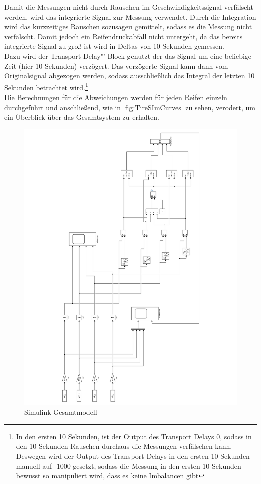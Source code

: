 \vspace{-1em}
Damit die Messungen nicht durch Rauschen im Geschwindigkeitssignal verfälscht werden, wird das integrierte Signal zur Messung verwendet. Durch die Integration wird das kurzzeitiges Rauschen sozusagen gemittelt, sodass es die Messung nicht verfälscht. Damit jedoch ein Reifendruckabfall nicht untergeht, da das bereits integrierte Signal zu groß ist wird in Deltas von 10 Sekunden gemessen.\\
Dazu wird der  \glqq Transport Delay"' Block genutzt der das Signal um eine beliebige Zeit (hier 10 Sekunden) verzögert. Das verzögerte Signal kann dann vom Originalsignal abgezogen werden, sodass ausschließlich das Integral der letzten 10 Sekunden betrachtet wird.\footnote{In den ersten 10 Sekunden, ist der Output des Transport Delays 0, sodass in den 10 Sekunden Rauschen durchaus die Messungen verfälschen kann. Deswegen wird der Output des Transport Delays in den ersten 10 Sekunden manuell auf -1000 gesetzt, sodass die Messung in den ersten 10 Sekunden bewusst so manipuliert wird, dass es keine Imbalancen gibt }\\
Die Berechnungen für die Abweichungen werden für jeden Reifen einzeln durchgeführt und anschließend, wie in \autoref{fig:TireSImCurves} zu sehen, verodert, um ein Überblick über das Gesamtsystem zu erhalten.\\


\begin{figure}[H]
	\centering
	\includegraphics[height=0.95\textheight]{../Graphiken/TireSimCurvesLandscape.pdf}
	\caption{Simulink-Gesamtmodell}
	\label{fig:TireSImCurves}
\end{figure}

